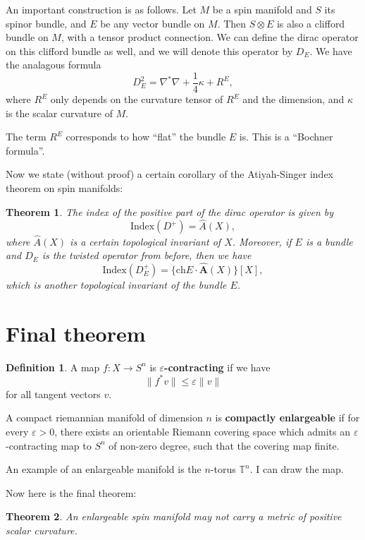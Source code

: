 \documentclass[11pt, reqno]{article}
\theoremstyle{plain}
\newtheorem*{theorem}{Theorem}
\theoremstyle{definition}
\newtheorem*{definition}{Definition}
\theoremstyle{remark}
\renewcommand{\epsilon}{\varepsilon}
\begin{document}
An important construction is as follows. Let $M$ be a spin manifold and $S$ its spinor bundle,
and $E$ be any vector bundle on $M$. Then $S \otimes E$ is also a clifford bundle on $M$,
with a tensor product connection. We can define the dirac operator on this clifford bundle as well, and 
we will denote this operator by $D_E$. We have the analagous formula
\[
    D_E^2 = \nabla^*\nabla + \frac{1}{4}\kappa + R^E,
\]
where $R^E$ only depends on the curvature tensor of $R^E$ and the dimension, and $\kappa$ is the scalar curvature
of $M$. 

The term $R^E$ corresponds to how ``flat'' the bundle $E$ is. This is a ``Bochner formula''.

Now we state (without proof) a certain corollary of the Atiyah-Singer index theorem on spin manifolds:
\begin{theorem}
    The index of the positive part of the dirac operator is given by
    \[
        \text{Index}(D^+) = \hat{A}(X),
    \]
    where $\hat{A}(X)$ is a certain topological invariant of $X$. Moreover, if $E$ is a bundle and 
    $D_E$ is the twisted operator from before, then we have
    \[
        \text{Index}(D_E^+) = \{\text{ch}E \cdot \hat{\textbf{A}}(X)\}[X],
    \]
    which is another topological invariant of the bundle $E$.
\end{theorem}

\section{Final theorem}

\begin{definition}
    A map $f: X \to S^n$ is \textbf{$\epsilon$-contracting} if we have
    \[
        \|f^*v\| \leq \epsilon \|v\|
    \]
    for all tangent vectors $v$. 

    A compact riemannian manifold of dimension $n$ is \textbf{compactly enlargeable} if for every $\epsilon > 0$, there exists an orientable
    Riemann covering space which admits an $\epsilon$-contracting map to $S^n$ of non-zero degree, such that
    the covering map finite.
\end{definition}

An example of an enlargeable manifold is the $n$-torus $\mathbb{T}^n$. I can draw the map.

Now here is the final theorem:

\begin{theorem}
    An enlargeable spin manifold may not carry a metric of positive scalar curvature. 
\end{theorem}
\end{document}
